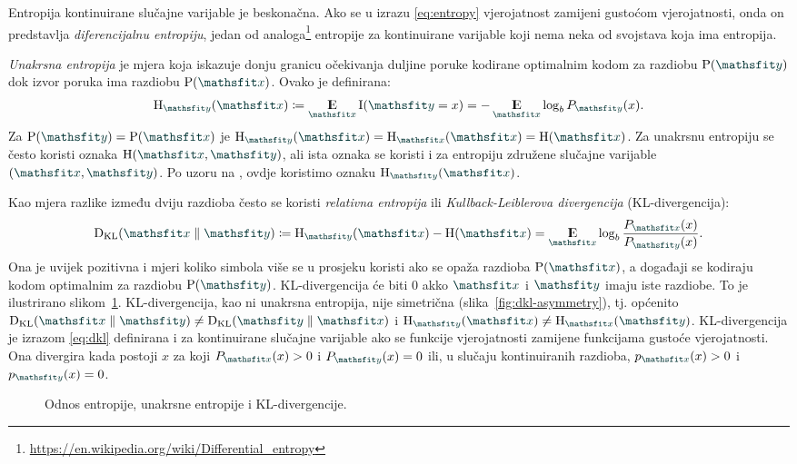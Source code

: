 \documentclass[utf8, diplomski, lmodern]{fer}
\begin{document}
Entropija kontinuirane slučajne varijable je beskonačna. Ako se u izrazu \eqref{eq:entropy} vjerojatnost zamijeni gustoćom vjerojatnosti, onda on predstavlja \emph{diferencijalnu entropiju}, jedan od analoga\footnote{\url{https://en.wikipedia.org/wiki/Differential_entropy}} entropije za kontinuirane varijable koji nema neka od svojstava koja ima entropija.

\emph{Unakrsna entropija} je mjera koja iskazuje donju granicu očekivanja duljine poruke kodirane optimalnim kodom za razdiobu $\P(\rvar y)$ dok izvor poruka ima  razdiobu $\P(\rvar x)$. Ovako je definirana:
\begin{align}
\H_{\rvar y}(\rvar x)\coloneqq \E_{\rvar x}\I(\rvar y=x) = -\E_{\rvar x}\log_b P_{\rvar y}(x) \text{.}
\end{align}
Za $\P(\rvar y) = \P(\rvar x)$ je $\H_{\rvar y}(\rvar x) = \H_{\rvar x}(\rvar x)=\H(\rvar x)$. Za unakrsnu entropiju se često koristi oznaka $\H(\rvar x,\rvar y)$, ali ista oznaka se koristi i za entropiju združene slučajne varijable $(\rvar x,\rvar y)$. Po uzoru na \citet{Olah:2015:VIT}, ovdje koristimo oznaku $\H_{\rvar y}(\rvar x)$.

Kao mjera razlike između dviju razdioba često se koristi \emph{relativna entropija} ili \emph{Kullback-Leiblerova divergencija} (KL-divergencija):
\begin{align}
	\Dkl{\rvar x}{\rvar y} \coloneqq \H_{\rvar y}(\rvar x) - \H(\rvar x) = \E_{\rvar x} \log_b\frac{P_{\rvar x}(x)}{P_{\rvar y}(x)} \text{.}
	\label{eq:dkl}
\end{align}
Ona je uvijek pozitivna i mjeri koliko simbola više se u prosjeku koristi ako se opaža razdioba $\P(\rvar x)$, a događaji se kodiraju kodom optimalnim za razdiobu $\P(\rvar y)$. KL-divergencija će biti $0$ akko $\rvar x$ i $\rvar y$ imaju iste razdiobe. To je ilustrirano slikom~\ref{fig:dkl}. KL-divergencija, kao ni unakrsna entropija, nije simetrična (slika~\ref{fig:dkl-asymmetry}), tj. općenito $\Dkl{\rvar x}{\rvar y}\neq\Dkl{\rvar y}{\rvar x}$ i $\H_{\rvar y}(\rvar x)\neq\H_{\rvar x}(\rvar y)$. KL-divergencija je izrazom \eqref{eq:dkl} definirana i za kontinuirane slučajne varijable ako se funkcije vjerojatnosti zamijene funkcijama gustoće vjerojatnosti. Ona divergira kada postoji $x$ za koji $P_{\rvar x}(x)>0$ i $P_{\rvar y}(x)=0$ ili, u slučaju kontinuiranih razdioba, $p_{\rvar x}(x)>0$ i $p_{\rvar y}(x)=0$.

\begin{figure}
	\centering
	\caption{Odnos entropije, unakrsne entropije i KL-divergencije.}
	\label{fig:dkl}
\end{figure}
\end{document}
